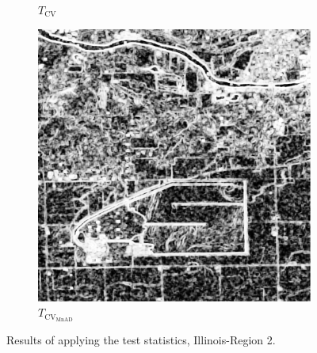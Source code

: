 \documentclass[aspectratio=1610,10pt]{beamer}
\begin{document}
\begin{frame}
\begin{figure}[H]
\begin{subfigure}[b]{0.3\textwidth}
    \caption{$T_\text{CV}$}
    \label{fig:real_images_test_Illinois-2}
  \end{subfigure}
  \hfill
  \begin{subfigure}[b]{0.3\textwidth}
    \centering
    \includegraphics[width=\textwidth]{../../Figures/PNG/mnad_Illinois_crops_1024}
    \caption{$T_{\text{CV}_{\text{MnAD}}}$}
    \label{fig:real_images_test_Illinois-3}
  \end{subfigure}
  \caption{Results of applying the test statistics, Illinois-Region 2.}
  \label{fig:real_images_test_Illinois}
\end{figure}
\end{frame} 
\end{document}
